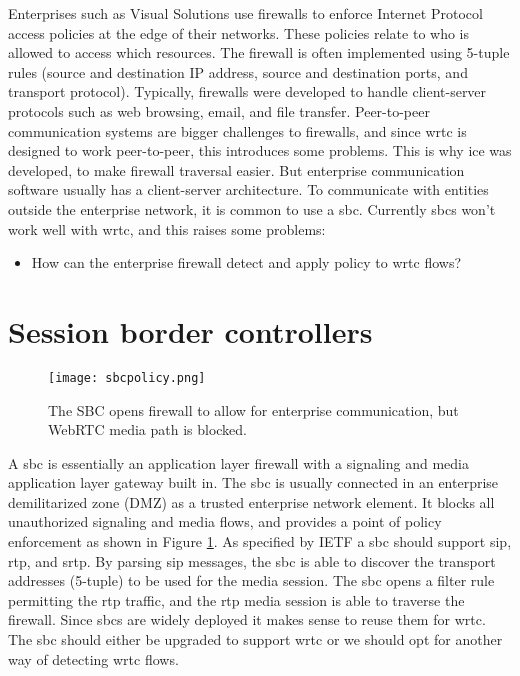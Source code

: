 Enterprises such as Visual Solutions use firewalls to enforce Internet Protocol access policies at the edge of their networks. These policies relate to who is allowed to access which resources. The firewall is often implemented using 5-tuple rules (source and destination IP address, source and destination ports, and transport protocol). Typically, firewalls were developed to handle client-server protocols such as web browsing, email, and file transfer\cite{johnston_taking_2013}. Peer-to-peer communication systems are bigger challenges to firewalls, and since \gls{wrtc} is designed to work peer-to-peer, this introduces some problems. This is why \gls{ice} was developed, to make firewall traversal easier. But enterprise communication software usually has a client-server architecture. To communicate with entities outside the enterprise network, it is common to use a \gls{sbc}. Currently \gls{sbc}s won't work well with \gls{wrtc}, and this raises some problems:

\begin{itemize}
\item{How can the enterprise firewall detect and apply policy to \gls{wrtc} flows?}
\end{itemize}

\section{Session border controllers}

\begin{figure}[here]
\centerline{\texttt{[image: sbcpolicy.png]}}
\caption{The SBC opens firewall to allow for enterprise communication, but WebRTC media path is blocked.}
\label{fig:sbc-policy}
\end{figure}

A \gls{sbc} is essentially an application layer firewall with a signaling and media application layer gateway built in. The \gls{sbc} is usually connected in an enterprise demilitarized zone (DMZ) as a trusted enterprise network element. It blocks all unauthorized signaling and media flows, and provides a point of policy enforcement as shown in Figure \ref{fig:sbc-policy}. As specified by IETF\cite{sbc} a \gls{sbc} should support \gls{sip}, \gls{rtp}, and \gls{srtp}. By parsing \gls{sip} messages, the \gls{sbc} is able to discover the transport addresses (5-tuple) to be used for the media session. The \gls{sbc} opens a filter rule permitting the \gls{rtp} traffic, and the \gls{rtp} media session is able to traverse the firewall. Since \gls{sbc}s are widely deployed it makes sense to reuse them for \gls{wrtc}. The \gls{sbc} should either be upgraded to support \gls{wrtc} or we should opt for another way of detecting \gls{wrtc} flows.

